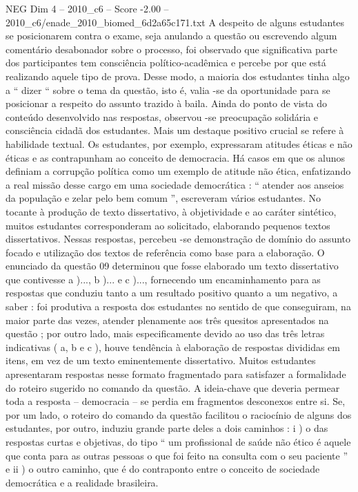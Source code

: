 \begin{textsample}{NEG Dim 4 – 2010\_c6 – Score -2.00 – 2010\_c6/enade\_2010\_biomed\_6d2a65c171.txt}
A despeito de alguns estudantes se posicionarem contra o exame, seja anulando a questão ou escrevendo algum comentário desabonador sobre o processo, foi observado que significativa parte dos participantes tem consciência político-acadêmica e percebe por que está realizando aquele tipo de prova.
Desse modo, a maioria dos estudantes tinha algo a “ dizer “ sobre o tema da questão, isto é, valia -se da oportunidade para se posicionar a respeito do assunto trazido à baila.
Ainda do ponto de vista do conteúdo desenvolvido nas respostas, observou -se preocupação solidária e consciência cidadã dos estudantes.
Mais um destaque positivo crucial se refere à habilidade textual.
Os estudantes, por exemplo, expressaram atitudes éticas e não éticas e as contrapunham ao conceito de democracia.
Há casos em que os alunos definiam a corrupção política como um exemplo de atitude não ética, enfatizando a real missão desse cargo em uma sociedade democrática : “ atender aos anseios da população e zelar pelo bem comum ”, escreveram vários estudantes.
No tocante à produção de texto dissertativo, à objetividade e ao caráter sintético, muitos estudantes corresponderam ao solicitado, elaborando pequenos textos dissertativos.
Nessas respostas, percebeu -se demonstração de domínio do assunto focado e utilização dos textos de referência como base para a elaboração.
O enunciado da questão 09 determinou que fosse elaborado um texto dissertativo que contivesse a )..., b )... e c )..., fornecendo um encaminhamento para as respostas que conduziu tanto a um resultado positivo quanto a um negativo, a saber : foi produtiva a resposta dos estudantes no sentido de que conseguiram, na maior parte das vezes, atender plenamente aos três quesitos apresentados na questão ; por outro lado, mais especificamente devido ao uso das três letras indicativas ( a, b e c ), houve tendência à elaboração de respostas divididas em itens, em vez de um texto eminentemente dissertativo.
Muitos estudantes apresentaram respostas nesse formato fragmentado para satisfazer a formalidade do roteiro sugerido no comando da questão.
A ideia-chave que deveria permear toda a resposta – democracia – se perdia em fragmentos desconexos entre si.
Se, por um lado, o roteiro do comando da questão facilitou o raciocínio de alguns dos estudantes, por outro, induziu grande parte deles a dois caminhos : i ) o das respostas curtas e objetivas, do tipo “ um profissional de saúde não ético é aquele que conta para as outras pessoas o que foi feito na consulta com o seu paciente ” e ii ) o outro caminho, que é do contraponto entre o conceito de sociedade democrática e a realidade brasileira.

\end{textsample}
